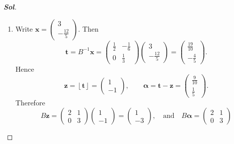 \begin{enumerate}
\begin{proof}[\normalfont\color{magenta}\bfseries Sol]
\begin{enumerate}
\begin{center}
		\end{center}
		\item Write $
		\mathbf x=\begin{pmatrix}{3}\\{-\frac{12}{5}}\end{pmatrix}$.
		Then
		\[
		\mathbf t
		=
		B^{-1}\mathbf x
		=
		\begin{pmatrix}
			\frac12&-\frac16\\[4pt]
			0&\frac13
		\end{pmatrix}
		\begin{pmatrix}{3}\\{-\frac{12}{5}}\end{pmatrix}
		=
		\begin{pmatrix}{\frac{19}{10}}\\{-\frac45}\end{pmatrix}.
		\]
		Hence
		\[
		\mathbf z=\left\lfloor \mathbf t\right\rfloor
		=
		\begin{pmatrix}{1}\\{-1}\end{pmatrix},
		\qquad
		\boldsymbol\alpha
		=
		\mathbf t-\mathbf z
		=
		\begin{pmatrix}{\frac9{10}}\\{\frac15}\end{pmatrix}.
		\]
		Therefore
		\[
		B\mathbf z
		=
		\begin{pmatrix}
			2&1\\
			0&3
		\end{pmatrix}
		\begin{pmatrix}{1}\\ {-1}\end{pmatrix}
		=
		\begin{pmatrix}{1}\\ {-3}\end{pmatrix},\quad\text{and}\quad
		B\boldsymbol\alpha
		=
		\begin{pmatrix}
			2&1\\
			0&3
		\end{pmatrix}
\]
\end{enumerate}
\end{proof}
\end{enumerate}
